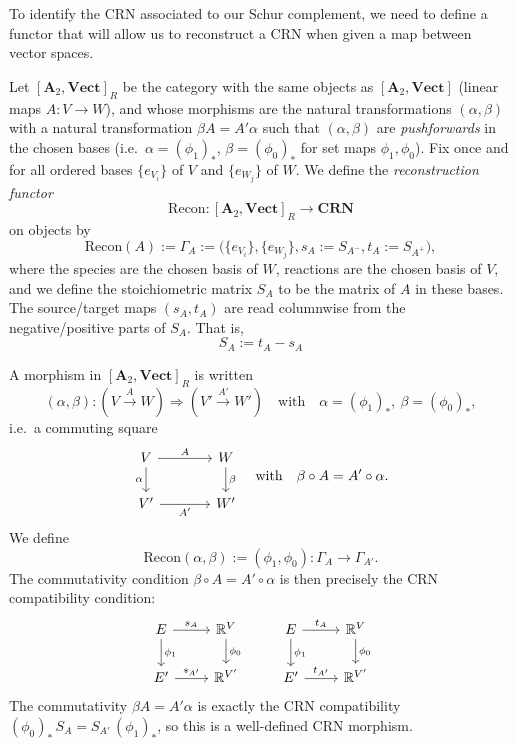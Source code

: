 \documentclass[11pt, one side, article]{memoir}
\begin{document}
\noindent To identify the CRN associated to our Schur complement, we need to define a functor that will allow us to reconstruct a CRN when given a map between vector spaces.

\begin{definition}
    Let $[\mathbf{A}_2,\mathbf{Vect}]_R$ be the category with the same objects as $[\mathbf{A}_2,\mathbf{Vect}]$
    (linear maps $A:V\to W$), and whose morphisms are the natural transformations
    $(\alpha,\beta)$ with a natural transformation $\beta A = A'\alpha$ such that $(\alpha,\beta)$ are \emph{pushforwards}
    in the chosen bases (i.e.\ $\alpha=(\phi_1)_*$, $\beta=(\phi_0)_*$ for set maps $\phi_1,\phi_0$).
    Fix once and for all ordered bases
    $\{e_{V_i}\}$ of $V$ and $\{e_{W_j}\}$ of $W$.
    We define the \textit{reconstruction functor}
    \[
        \mathrm{Recon} : [\mathbf{A}_2,\mathbf{Vect}]_R \longrightarrow \mathbf{CRN}
    \]
    on objects by
    \[
        \mathrm{Recon}(A)
        := \Gamma_A
        := \bigl(\{e_{V_i}\}, \{e_{W_j}\}, s_A:=S_{A^-}, t_A:=S_{A^+}\bigr),
    \]
    where the species are the chosen basis of $W$, reactions are the chosen basis of $V$, and we define the stoichiometric matrix $S_A$ to be the matrix of $A$ in these bases. The source/target maps $(s_A,t_A)$ are read columnwise from the negative/positive parts of $S_A$. That is, 
    \[
    S_A:=t_A - s_A
    \]
    
    \noindent A morphism in $[\mathbf{A}_2,\mathbf{Vect}]_R$ is written
    \[
    (\alpha,\beta):(V \xrightarrow{A} W) \Longrightarrow (V' \xrightarrow{A'} W')
    \quad\text{with}\quad \alpha=(\phi_1)_*,\ \beta=(\phi_0)_*,
    \]
    i.e.\ a commuting square
    \[
    \begin{tikzcd}[column sep=large]
        V \arrow[r,"A"] \arrow[d,"\alpha"'] &
        W \arrow[d,"\beta"] \\
        V' \arrow[r,"A'"'] &
        W'
    \end{tikzcd}
    \quad\text{with}\quad
    \beta \circ A = A' \circ \alpha.
    \]
    We define
    \[
        \mathrm{Recon}(\alpha,\beta)
        := (\phi_1,\phi_0) \colon \Gamma_A \longrightarrow \Gamma_{A'}.
    \]
    The commutativity condition
    $\beta \circ A = A' \circ \alpha$ is then precisely the CRN
    compatibility condition:
    \begin{equation*}
        \begin{tikzcd}
    	E & {\mathbb{R}^V} & E & {\mathbb{R}^V} \\
    	{E'} & {\mathbb{R}^{V'}} & {E'} & {\mathbb{R}^{V'}}
    	\arrow["s_A", from=1-1, to=1-2]
    	\arrow["{\phi_1}", from=1-1, to=2-1]
    	\arrow["{\phi_0}", from=1-2, to=2-2]
    	\arrow["t_A", from=1-3, to=1-4]
    	\arrow["{\phi_1}", from=1-3, to=2-3]
    	\arrow["{\phi_0}", from=1-4, to=2-4]
    	\arrow["{s_{A'}}", from=2-1, to=2-2]
    	\arrow["{t_{A'}}", from=2-3, to=2-4]
        \end{tikzcd}
    \end{equation*}
    The commutativity $\beta A = A' \alpha$ is exactly the CRN compatibility
    $(\phi_0)_*\,S_A = S_{A'}\,(\phi_1)_*$, so this is a well-defined CRN morphism.
        
\end{definition}
\end{document}
